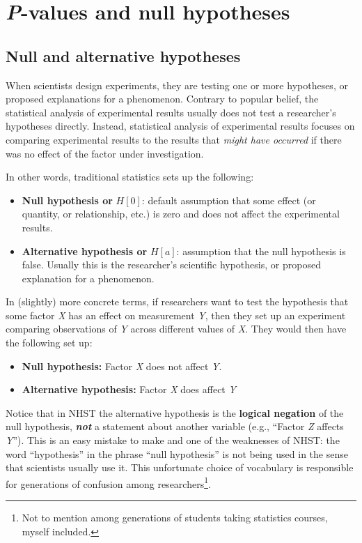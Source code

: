 \documentclass[
  13,
  letterpaper,
]{report}
\begin{document}
\section{\texorpdfstring{\emph{P}-values and null
hypotheses}{P-values and null hypotheses}}\label{sec-01-pvals}

\subsection{Null and alternative hypotheses}\label{sec-01-pvals-null}

When scientists design experiments, they are testing one or more
hypotheses, or proposed explanations for a phenomenon. Contrary to
popular belief, the statistical analysis of experimental results usually
does not test a researcher's hypotheses directly. Instead, statistical
analysis of experimental results focuses on comparing experimental
results to the results that \emph{might have occurred} if there was no
effect of the factor under investigation.

In other words, traditional statistics sets up the following:

\begin{itemize}
\item
  \textbf{Null hypothesis or} \(H[0]\): default assumption that some
  effect (or quantity, or relationship, etc.) is zero and does not
  affect the experimental results.
\item
  \textbf{Alternative hypothesis or} \(H[a]\): assumption that the null
  hypothesis is false. Usually this is the researcher's scientific
  hypothesis, or proposed explanation for a phenomenon.
\end{itemize}

In (slightly) more concrete terms, if researchers want to test the
hypothesis that some factor \emph{X} has an effect on measurement
\emph{Y}, then they set up an experiment comparing observations of
\emph{Y} across different values of \emph{X}. They would then have the
following set up:

\begin{itemize}
\item
  \textbf{Null hypothesis:} Factor \emph{X} does not affect \emph{Y}.
\item
  \textbf{Alternative hypothesis:} Factor \emph{X} does affect \emph{Y}
\end{itemize}

Notice that in NHST the alternative hypothesis is the \textbf{logical
negation} of the null hypothesis, \textbf{\emph{not}} a statement about
another variable (e.g., ``Factor \emph{Z} affects \emph{Y}''). This is
an easy mistake to make and one of the weaknesses of NHST: the word
``hypothesis'' in the phrase ``null hypothesis'' is not being used in
the sense that scientists usually use it. This unfortunate choice of
vocabulary is responsible for generations of confusion among
researchers\footnote{Not to mention among generations of students taking
  statistics courses, myself included.}.
\end{document}
